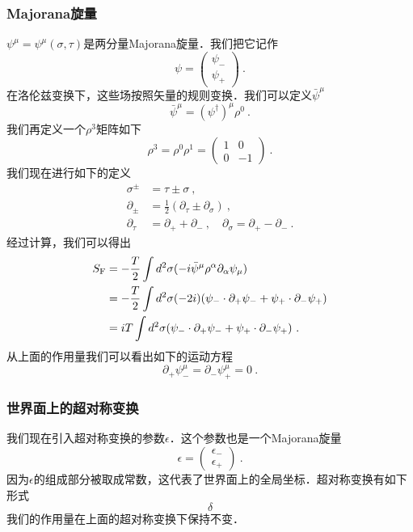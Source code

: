 \subsubsection{Majorana旋量}
$\psi^\mu = \psi^\mu(\sigma,\tau)$是两分量Majorana旋量．我们把它记作
\begin{equation}
\psi = \begin{pmatrix}
\psi_- \\
\psi_+
\end{pmatrix}~.
\end{equation}
在洛伦兹变换下，这些场按照矢量的规则变换．我们可以定义$\bar\psi^\mu$
\begin{equation}
\bar\psi^\mu = (\psi^\dagger)^\mu \rho^0~.
\end{equation}
我们再定义一个$\rho^3$矩阵如下
\begin{equation}
\rho^3 = \rho^0 \rho^1 = \begin{pmatrix}
1 & 0 \\
0 & -1 
\end{pmatrix}~.
\end{equation}
我们现在进行如下的定义
\begin{equation}
\begin{aligned}
\sigma^{\pm} & = \tau \pm \sigma~, \\
\partial_{\pm} & = \frac{1}{2} (\partial_\tau \pm \partial_\sigma)~, \\
\partial_\tau & = \partial_+ + \partial_-~, \quad \partial_\sigma = \partial_+ - \partial_- ~.
\end{aligned}
\end{equation}
经过计算，我们可以得出
\begin{equation}
\begin{aligned}
S_{\rm F} & = - \frac{T}{2} \int d^2 \sigma (- i \bar \psi^\mu \rho^\alpha \partial_\alpha \psi_\mu ) \\
& = - \frac{T}{2} \int d^2\sigma (-2i) (\psi_-\cdot\partial_+\psi_- + \psi_+\cdot \partial_- \psi_+) \\
& = i T\int d^2\sigma (\psi_-\cdot \partial_+ \psi_- +\psi_+\cdot \partial_- \psi_+ )~.
\end{aligned}
\end{equation}
从上面的作用量我们可以看出如下的运动方程
\begin{equation}
\partial_+\psi^\mu_- = \partial_-\psi^\mu_+ = 0~.
\end{equation}

\subsubsection{世界面上的超对称变换}
我们现在引入超对称变换的参数$\epsilon$．这个参数也是一个Majorana旋量
\begin{equation}
\epsilon = \begin{pmatrix}
\epsilon_- \\
\epsilon_+
\end{pmatrix}~.
\end{equation}
因为$\epsilon$的组成部分被取成常数，这代表了世界面上的全局坐标．超对称变换有如下形式
\begin{equation}
\delta 
\end{equation}
我们的作用量在上面的超对称变换下保持不变．

















